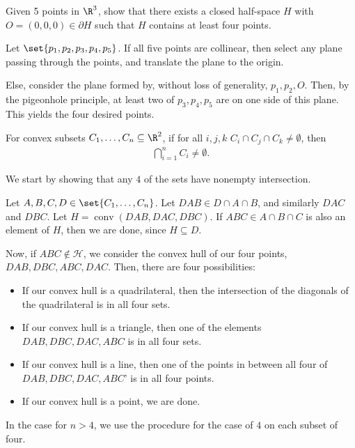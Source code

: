 \documentclass[10pt]{mypackage}
\begin{document}
\begin{problem}
Given 5 points in $\R^3$, show that there exists a closed half-space $H$ with $O = (0,0,0)\in \partial H$ such that $H$ contains at least four points.
\end{problem}
\begin{solution}
  Let $\set{p_1,p_2,p_3,p_4,p_5}$. If all five points are collinear, then select any plane passing through the points, and translate the plane to the origin.\newline

  Else, consider the plane formed by, without loss of generality, $p_1,p_2,O$. Then, by the pigeonhole principle, at least two of $p_3,p_4,p_5$ are on one side of this plane. This yields the four desired points.
\end{solution}
\begin{problem}
For convex subsets $C_1,\dots,C_n\subseteq \R^2$, if for all $i,j,k$ $C_i\cap C_j \cap C_k \neq \emptyset$, then
\begin{align*}
  \bigcap_{i=1}^{n}C_i\neq \emptyset.
\end{align*}
\end{problem}
\begin{solution}
  We start by showing that any $4$ of the sets have nonempty intersection.\newline

  Let $A,B,C,D\in \set{C_1,\dots,C_n}$. Let $DAB \in D\cap A \cap B$, and similarly $DAC$ and $DBC$. Let $H = \operatorname{conv}\left( DAB,DAC,DBC \right)$. If $ABC\in A\cap B \cap C$ is also an element of $H$, then we are done, since $H\subseteq D$.\newline

  Now, if $ABC\notin \mathcal{H}$, we consider the convex hull of our four points, $DAB,DBC,ABC,DAC$. Then, there are four possibilities:
  \begin{itemize}
    \item If our convex hull is a quadrilateral, then the intersection of the diagonals of the quadrilateral is in all four sets.
    \item If our convex hull is a triangle, then one of the elements $DAB,DBC,DAC,ABC$ is in all four sets.
    \item If our convex hull is a line, then one of the points in between all four of $DAB,DBC,DAC,ABC$' is in all four points.
    \item If our convex hull is a point, we are done.
  \end{itemize}
  In the case for $n > 4$, we use the procedure for the case of $4$ on each subset of four.
\end{solution}
\end{document}
